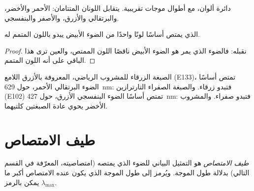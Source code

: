 \begin{omfigure}

{\small دائرة ألوان، مع أطوال موجات تقريبية. يتقابل اللونان المتتامان: الأحمر
والأخضر، والبرتقالي والأزرق، والأصفر
والبنفسجي.}
\end{omfigure}

\begin{proposition}\label{prop:g11:absorbance:colour-seen}
 الذي يمتص أساسًا لونًا واحدًا من الضوء الأبيض يبدو باللون المتمم
له.
\end{proposition}

\begin{proof}
نقبله: فالضوء الذي يمر هو الضوء الأبيض ناقصًا اللون الممتص، والعين ترى هذا
الباقي على أنه اللون المتمم.
\end{proof}

\begin{example}\label{ex:g11:absorbance:dyes}
الصبغة الزرقاء للمشروب الرياضي، المعروفة بالأزرق اللامع (E133)، تمتص أساسًا
الضوء البرتقالي الأحمر، حول \qty{629}{nm}: فتبدو زرقاء. والصبغة الصفراء
التارترازين (E102) تمتص أساسًا الضوء البنفسجي الأزرق، حول
\qty{427}{nm}: فتبدو صفراء. والمشروب الأخضر يحوي عادة الصبغتين كلتيهما.
\end{example}

\section{طيف الامتصاص}

\begin{definition}\label{def:g11:absorbance:spectrum}
\emph{طيف الامتصاص}  هو التمثيل البياني للضوء الذي
يمتصه (امتصاصيته، المعرّفة في القسم التالي) بدلالة طول الموجة. ويُرمز إلى طول
الموجة الذي يكون عنده الامتصاص أكبر ما يمكن بالرمز $\lambda_{\max}$.
\end{definition}

